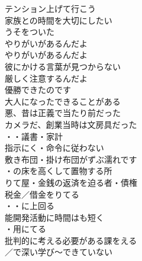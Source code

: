\begin{multicols}{2}
テンション上げて行こう\\
家族との時間を大切にしたい\\
うそをついた\\
やりがいがあるんだよ\\
やりがいがあるんだよ\\
彼にかける言葉が見つからない\\
厳しく注意するんだよ\\
優勝できたのです\\
大人になったできることがある\\
悪、昔は正義で当たり前だった\\
カメラだ、創業当時は文房具だった\\

・・議書・家計\\
指示にく・命令に従わない\\
敷き布団・掛け布団がずぶ濡れです\\
・の床を高くして置物する所\\

りて屋・金銭の返済を迫る者・債権\\
税金／借金をりてる\\

・・に上回る\\
能開発活動に時間はも短く\\
・用にてる\\
批判的に考える必要がある課をえる\\
／で深い学び〜できていない\\


\end{multicols}
